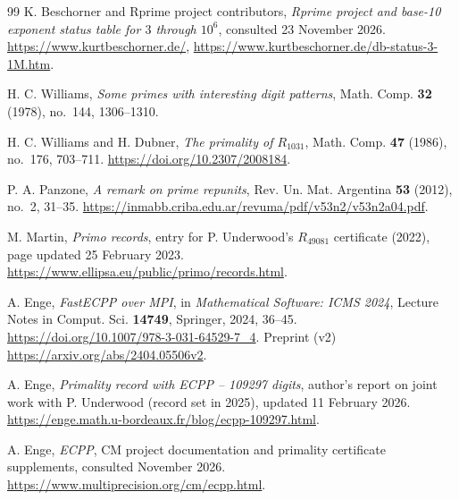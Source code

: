 \documentclass[11pt]{article}
\begin{document}
\begin{thebibliography}{99}
K. Beschorner and Rprime project contributors, \emph{Rprime project
and base-10 exponent status table for \(3\) through \(10^6\)},
consulted 23 November 2026.
\url{https://www.kurtbeschorner.de/},
\url{https://www.kurtbeschorner.de/db-status-3-1M.htm}.

H. C. Williams, \emph{Some primes with interesting digit patterns},
Math. Comp. \textbf{32} (1978), no.~144, 1306--1310.

H. C. Williams and H. Dubner, \emph{The primality of \(R_{1031}\)},
Math. Comp. \textbf{47} (1986), no.~176, 703--711.
\url{https://doi.org/10.2307/2008184}.

P. A. Panzone, \emph{A remark on prime repunits},
Rev. Un. Mat. Argentina \textbf{53} (2012), no.~2, 31--35.
\url{https://inmabb.criba.edu.ar/revuma/pdf/v53n2/v53n2a04.pdf}.

M. Martin, \emph{Primo records}, entry for P. Underwood's
\(R_{49081}\) certificate (2022), page updated 25 February 2023.
\url{https://www.ellipsa.eu/public/primo/records.html}.

A. Enge, \emph{FastECPP over MPI}, in \emph{Mathematical Software:
ICMS 2024}, Lecture Notes in Comput. Sci. \textbf{14749},
Springer, 2024, 36--45.
\url{https://doi.org/10.1007/978-3-031-64529-7_4}.
Preprint (v2) \url{https://arxiv.org/abs/2404.05506v2}.

A. Enge, \emph{Primality record with ECPP -- 109297 digits},
author's report on joint work with P. Underwood (record set in 2025),
updated 11 February 2026.
\url{https://enge.math.u-bordeaux.fr/blog/ecpp-109297.html}.

A. Enge, \emph{ECPP}, CM project documentation and primality
certificate supplements, consulted November 2026.
\url{https://www.multiprecision.org/cm/ecpp.html}.

\end{thebibliography}
\end{document}
